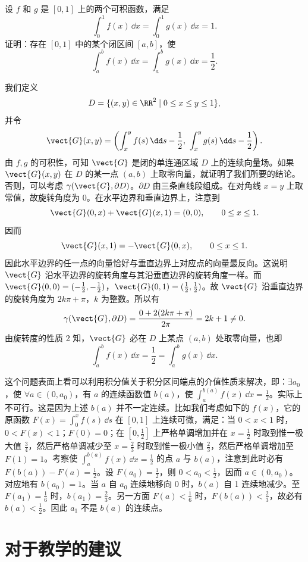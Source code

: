 \begin{xexample}[24.4.3]
设 $f$ 和 $g$ 是 $[0,1]$ 上的两个可积函数，满足
\[
  \int_0^1f(x)\,\dd x=\int_0^1g(x)\,\dd x=1.
\]
证明：存在 $[0,1]$ 中的某个闭区间 $[a,b]$，使
\[
  \int_a^bf(x)\,\dd x=\int_a^bg(x)\,\dd x=\frac12.
\]
\end{xexample}
\begin{xproof}
我们定义
\[
  D=\{(x,y)\in\RR^2\mid0\le x\le y\le1\},
\]
并令
\[
  \vect{G}(x,y)=\left(\int_x^yf(s)\,\dd s-\frac12,\ \int_x^yg(s)\,\dd s-\frac12\right).
\]
由 $f,g$ 的可积性，可知 $\vect{G}$ 是闭的单连通区域 $D$ 上的连续向量场。如果 $\vect{G}(x,y)$ 在 $D$ 的某一点 $(a,b)$ 上取零向量，就证明了我们所要的结论。否则，可以考虑 $\gamma(\vect{G},\partial D)$。$\partial D$ 由三条直线段组成。在对角线 $x=y$ 上取常值，故旋转角度为 0。在水平边界和垂直边界上，注意到
\[
  \vect{G}(0,x)+\vect{G}(x,1)=(0,0),\qquad0\le x\le1.
\]
因而
\[
  \vect{G}(x,1)=-\vect{G}(0,x),\qquad0\le x\le1.
\]
因此水平边界的任一点的向量恰好与垂直边界上对应点的向量最反向。这说明 $\vect{G}$ 沿水平边界的旋转角度与其沿垂直边界的旋转角度一样。而 $\vect{G}(0,0)=(-\frac12,-\frac12)$，$\vect{G}(0,1)=(\frac12,\frac12)$。故 $\vect{G}$ 沿垂直边界的旋转角度为 $2k\pi+\pi$，$k$ 为整数。所以有
\[
  \gamma(\vect{G},\partial D)=\frac{0+2(2k\pi+\pi)}{2\pi}=2k+1\ne0.
\]
由旋转度的性质 2 知，$\vect{G}$ 必在 $D$ 上某点 $(a,b)$ 处取零向量，也即
\[
  \int_a^bf(x)\,\dd x=\frac12=\int_a^bg(x)\,\dd x.
\]
\end{xproof}

\begin{xremark}
这个问题表面上看可以利用积分值关于积分区间端点的介值性质来解决，即：$\exists a_0$，使 $\forall a\in(0,a_0)$，有 $a$ 的连续函数值 $b(a)$，使 $\int_a^{b(a)}f(x)\,\dd x=\frac12$。实际上不可行。这是因为上述 $b(a)$ 并不一定连续。比如我们考虑如下的 $f(x)$，它的原函数 $F(x)=\int_0^xf(s)\,\dd s$ 在 $[0,1]$ 上连续可微，满足：当 $0<x<1$ 时，$0<F(x)<1$；$F(0)=0$；在 $[0,\frac12]$ 上严格单调增加并在 $x=\frac12$ 时取到惟一极大值 $\frac34$，然后严格单调减少至 $x=\frac23$ 时取到惟一极小值 $\frac23$，然后严格单调增加至 $F(1)=1$。考察使 $\int_a^{b(a)}f(x)\,\dd x=\frac12$ 的点 $a$ 与 $b(a)$，注意到此时必有 $F(b(a))-F(a)=\frac12$。设 $F(a_0)=\frac12$，则 $0<a_0<\frac12$，因而 $a\in(0,a_0)$。对应地有 $b(a_0)=1$。当 $a$ 自 $a_0$ 连续地移向 0 时，$b(a)$ 自 1 连续地减少。至 $F(a_1)=\frac16$ 时，$b(a_1)=\frac23$。另一方面 $F(a)<\frac16$ 时，$F(b(a))<\frac23$，故必有 $b(a)<\frac12$。因此 $a_1$ 不是 $b(a)$ 的连续点。
\end{xremark}

\section{对于教学的建议}

